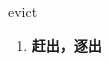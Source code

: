
\begin{frame}
{\huge evict}
\begin{center}
\begin{enumerate}\Large
  \item \textbf{赶出，逐出}
\end{enumerate}
\end{center}
\end{frame}
